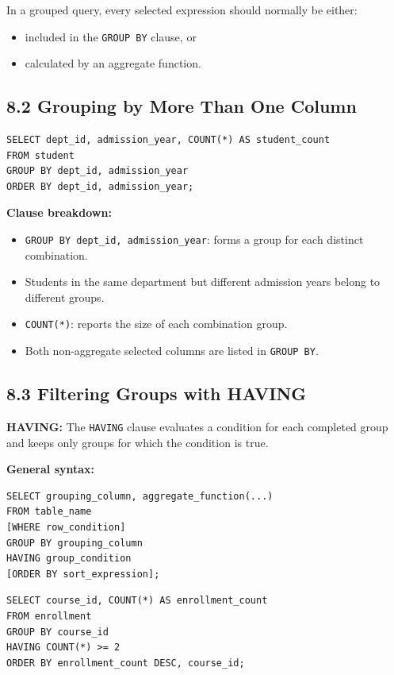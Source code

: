 \documentclass[12pt,a4paper]{article}
\newcommand{\defbox}[2]{%
  \vspace{0.2cm}
  \noindent\colorbox{boxgray}{\parbox{\dimexpr\linewidth-2\fboxsep}{%
    \textbf{#1:} #2
  }}
  \vspace{0.2cm}
}
\begin{document}
\noindent In a grouped query, every selected expression should normally be either:
\begin{itemize}
    \item included in the \texttt{GROUP BY} clause, or
    \item calculated by an aggregate function.
\end{itemize}

\subsection*{8.2 Grouping by More Than One Column}
\begin{verbatim}
SELECT dept_id, admission_year, COUNT(*) AS student_count
FROM student
GROUP BY dept_id, admission_year
ORDER BY dept_id, admission_year;
\end{verbatim}

\noindent\textbf{Clause breakdown:}
\begin{itemize}
    \item \texttt{GROUP BY dept\_id, admission\_year}: forms a group for each distinct combination.
    \item Students in the same department but different admission years belong to different groups.
    \item \texttt{COUNT(*)}: reports the size of each combination group.
    \item Both non-aggregate selected columns are listed in \texttt{GROUP BY}.
\end{itemize}

\subsection*{8.3 Filtering Groups with HAVING}
\defbox{HAVING}{The \texttt{HAVING} clause evaluates a condition for each completed group and keeps
only groups for which the condition is true.}

\noindent\textbf{General syntax:}
\begin{verbatim}
SELECT grouping_column, aggregate_function(...)
FROM table_name
[WHERE row_condition]
GROUP BY grouping_column
HAVING group_condition
[ORDER BY sort_expression];
\end{verbatim}

\begin{verbatim}
SELECT course_id, COUNT(*) AS enrollment_count
FROM enrollment
GROUP BY course_id
HAVING COUNT(*) >= 2
ORDER BY enrollment_count DESC, course_id;
\end{verbatim}
\end{document}
